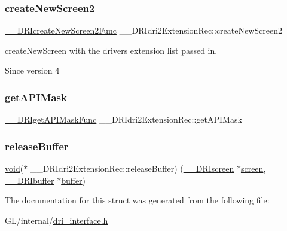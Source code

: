 \mbox{\label{struct_____d_r_idri2_extension_rec_a47c8ee98c9b4192e1d167d9112c5cd67}} 
\subsubsection{\texorpdfstring{create\+New\+Screen2}{createNewScreen2}}
{\footnotesize\ttfamily \hyperlink{dri__interface_8h_a2055c7208f40b9580b75148d76365262}{\+\_\+\+\_\+\+D\+R\+Icreate\+New\+Screen2\+Func} \+\_\+\+\_\+\+D\+R\+Idri2\+Extension\+Rec\+::create\+New\+Screen2}

create\+New\+Screen with the driver\textquotesingle{}s extension list passed in.

\begin{DoxySince}{Since}
version 4 
\end{DoxySince}
\mbox{\label{struct_____d_r_idri2_extension_rec_a9c3f7b24e9b71140c7442456e7f19e95}} 
\subsubsection{\texorpdfstring{get\+A\+P\+I\+Mask}{getAPIMask}}
{\footnotesize\ttfamily \hyperlink{dri__interface_8h_a89f080ad71d4ec1295cb23c069e086e6}{\+\_\+\+\_\+\+D\+R\+Iget\+A\+P\+I\+Mask\+Func} \+\_\+\+\_\+\+D\+R\+Idri2\+Extension\+Rec\+::get\+A\+P\+I\+Mask}

\mbox{\label{struct_____d_r_idri2_extension_rec_a1f4dd792279f85e71c5cd4c8c47b5bdc}} 
\subsubsection{\texorpdfstring{release\+Buffer}{releaseBuffer}}
{\footnotesize\ttfamily \hyperlink{_s_d_l__opengles2__gl2ext_8h_ae5d8fa23ad07c48bb609509eae494c95}{void}($\ast$ \+\_\+\+\_\+\+D\+R\+Idri2\+Extension\+Rec\+::release\+Buffer) (\hyperlink{dri__interface_8h_a9961b01d421ee1fd6ed3c05acc9ca561}{\+\_\+\+\_\+\+D\+R\+Iscreen} $\ast$\hyperlink{cad_8h_ae04e09e4e3831bfc1632c509ae37dcec}{screen}, \hyperlink{dri__interface_8h_a99ccb036a4865817ec4d06d153ba2446}{\+\_\+\+\_\+\+D\+R\+Ibuffer} $\ast$\hyperlink{glcorearb_8h_a76461e97a098d2c9ae20ac193d3825ae}{buffer})}



The documentation for this struct was generated from the following file\+:\begin{DoxyCompactItemize}
\item 
G\+L/internal/\hyperlink{dri__interface_8h}{dri\+\_\+interface.\+h}\end{DoxyCompactItemize}
